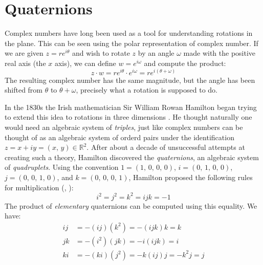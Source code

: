 \documentclass{article}
\begin{document}
    \section{Quaternions}
        Complex numbers have long been used as a tool for understanding
        rotations in the plane. This can be seen using the polar
        representation of complex number. If we are given $z=re^{i\theta}$ and
        wish to rotate $z$ by an angle $\omega$ made with the positive real
        axis (the $x$ axis), we can define
        $w=e^{i\omega}$ and compute the product:
        \begin{equation}
            \label{eqn:complex_numbers_as_rotations}
            z\cdot{w}=re^{i\theta}\cdot{e}^{i\omega}=re^{i(\theta+\omega)}
        \end{equation}
        The resulting complex number has the same magnitude, but the angle
        has been shifted from $\theta$ to $\theta+\omega$, precisely what a
        rotation is supposed to do.
        \par\hfill\par
        In the 1830s the Irish mathematician Sir William Rowan Hamilton began
        trying to extend this idea to rotations in three dimensions
        \cite[p.~2]{BuchmannQuaternionHistory}. He thought naturally one would
        need an algebraic system of \textit{triples}, just like complex numbers
        can be thought of as an algebraic system of orderd pairs under the
        identification $z=x+iy=(x,\,y)\in\mathbb{R}^{2}$.
        After about a decade of unsuccessful attempts at creating such a
        theory, Hamilton discovered the \textit{quaternions}, an algebraic
        system of \textit{quadruplets}. Using the convention
        $1=(1,\,0,\,0,\,0)$, $i=(0,\,1,\,0,\,0)$, $j=(0,\,0,\,1,\,0)$, and
        $k=(0,\,0,\,0,\,1)$, Hamilton proposed the following rules for
        multiplication (\cite[p.~158]{HamiltonElementsOfQuaternions},
        \cite[p.~1]{HamiltonOnQuaternions}):
        \begin{equation}
            i^{2}=j^{2}=k^{2}=ijk=-1
        \end{equation}
        The product of \textit{elementary} quaternions can be computed using
        this equality. We have:
        \begin{align}
            ij&=-(ij)(k^2)=-(ijk)k=k\\
            jk&=-(i^2)(jk)=-i(ijk)=i\\
            ki&=-(ki)(j^{2})=-k(ij)j=-k^{2}j=j
        \end{align}
\end{document}
